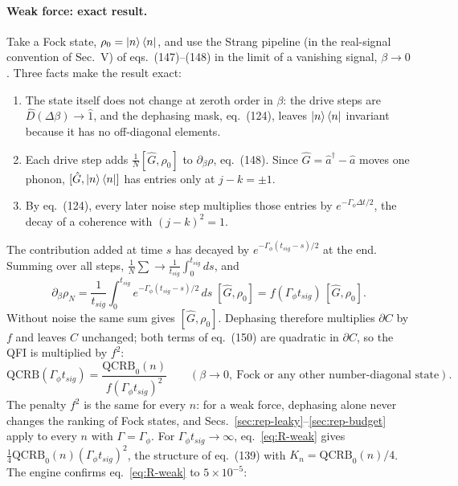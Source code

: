 \paragraph{Weak force: exact result.} Take a Fock state, $\rho_0 = \ket{n}\bra{n}$, and use the Strang pipeline (in the real-signal convention of Sec.~V) of eqs.~(147)--(148) in the limit of a vanishing signal, $\beta \to 0$. Three facts make the result exact:
\begin{enumerate}
    \item The state itself does not change at zeroth order in $\beta$: the drive steps are $\hat{D}(\Delta\beta) \to \hat{1}$, and the dephasing mask, eq.~(124), leaves $\ket{n}\bra{n}$ invariant because it has no off-diagonal elements.
    \item Each drive step adds $\tfrac{1}{N}[\hat{G}, \rho_0]$ to $\partial_\beta\rho$, eq.~(148). Since $\hat{G} = \hat{a}^\dagger - \hat{a}$ moves one phonon, $[\hat{G}, \ket{n}\bra{n}]$ has entries only at $j - k = \pm1$.
    \item By eq.~(124), every later noise step multiplies those entries by $e^{-\Gamma_\phi\Delta t/2}$, the decay of a coherence with $(j - k)^2 = 1$.
\end{enumerate}
The contribution added at time $s$ has decayed by $e^{-\Gamma_\phi(t_{sig} - s)/2}$ at the end. Summing over all steps, $\tfrac{1}{N}\sum \to \tfrac{1}{t_{sig}}\int_0^{t_{sig}}ds$, and
\begin{equation*}
    \partial_\beta\rho_N = \frac{1}{t_{sig}}\int_0^{t_{sig}} e^{-\Gamma_\phi(t_{sig}-s)/2}\,ds\;[\hat{G}, \rho_0] = f(\Gamma_\phi t_{sig})\,[\hat{G}, \rho_0].
\end{equation*}
Without noise the same sum gives $[\hat{G}, \rho_0]$. Dephasing therefore multiplies $\partial C$ by $f$ and leaves $C$ unchanged; both terms of eq.~(150) are quadratic in $\partial C$, so the QFI is multiplied by $f^2$:
\begin{equation}
\label{eq:R-weak}
    \mathrm{QCRB}(\Gamma_\phi t_{sig}) = \frac{\mathrm{QCRB}_0(n)}{f(\Gamma_\phi t_{sig})^2}
    \qquad (\beta \to 0,\ \text{Fock or any other number-diagonal state}).
\end{equation}
The penalty $f^2$ is the same for every $n$: for a weak force, dephasing alone never changes the ranking of Fock states, and Secs.~\ref{sec:rep-leaky}--\ref{sec:rep-budget} apply to every $n$ with $\Gamma = \Gamma_\phi$. For $\Gamma_\phi t_{sig} \to \infty$, eq.~\eqref{eq:R-weak} gives $\tfrac{1}{4}\mathrm{QCRB}_0(n)(\Gamma_\phi t_{sig})^2$, the structure of eq.~(139) with $K_n = \mathrm{QCRB}_0(n)/4$. The engine confirms eq.~\eqref{eq:R-weak} to $5\times10^{-5}$:

